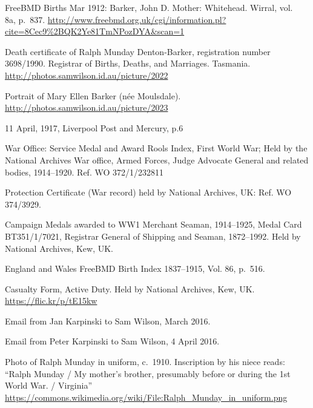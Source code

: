 \begin{thebibliography}{99}
	FreeBMD Births Mar 1912: Barker, John D. Mother: Whitehead. Wirral, vol.~ 8a, p.~837.
	\url{http://www.freebmd.org.uk/cgi/information.pl?cite=8Cec9\%2BQK2Ye81TmNPozDYA&scan=1}

	Death certificate of Ralph Munday Denton-Barker, registration number 3698/1990. Registrar of Births, Deaths, and Marriages. Tasmania.
	\url{http://photos.samwilson.id.au/picture/2022}

	Portrait of Mary Ellen Barker (n\'{e}e Moulsdale).
	\url{http://photos.samwilson.id.au/picture/2023}

	11 April, 1917, Liverpool Post and Mercury, p.6

	War Office: Service Medal and Award Rools Index, First World War; Held by the National Archives War office, 	Armed Forces, Judge Advocate General and related bodies, 1914--1920. Ref. WO 372/1/232811

	Protection Certificate (War record) held by National Archives, UK: Ref. WO 374/3929.

	Campaign Medals awarded to WW1 Merchant Seaman, 1914--1925, Medal Card BT351/1/7021, Registrar General of
	Shipping and Seaman, 1872--1992. Held by National Archives, Kew, UK.

	England and Wales FreeBMD Birth Index 1837--1915, Vol. 86, p.~516.

	Casualty Form, Active Duty. Held by National Archives, Kew, UK. \url{https://flic.kr/p/tE15kw}

	Email from Jan Karpinski to Sam Wilson, March 2016.

	Email from Peter Karpinski to Sam Wilson, 4 April 2016.

	Photo of Ralph Munday in uniform, c.~1910.
	Inscription by his niece  reads:
	``Ralph Munday / My mother's brother, presumably before or during the 1st World War. / Virginia''
	\url{https://commons.wikimedia.org/wiki/File:Ralph_Munday_in_uniform.png}

\end{thebibliography}
